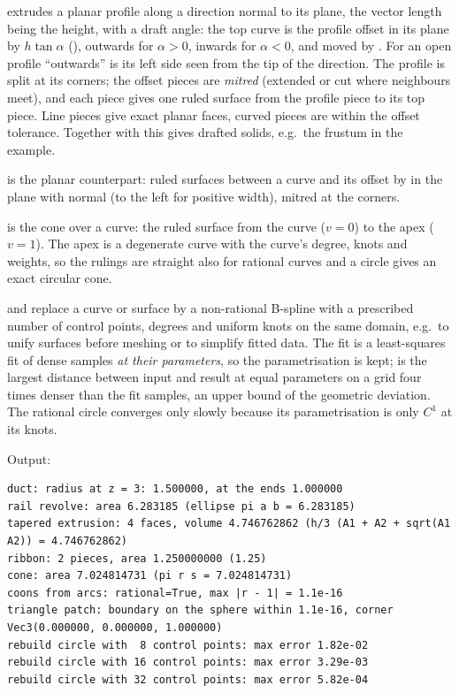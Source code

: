  extrudes a planar profile along a direction normal to its plane, the
vector length being the height, with a draft angle: the top curve is the profile offset in its
plane by $h\tan\alpha$ (), outwards for $\alpha > 0$, inwards for
$\alpha < 0$, and moved by . For an open profile ``outwards'' is its left side
seen from the tip of the direction. The profile is split at its corners; the offset pieces are
\emph{mitred} (extended or cut where neighbours meet), and each piece gives one ruled surface
from the profile piece to its top piece. Line pieces give exact planar faces, curved pieces are
within the offset tolerance. Together with  this gives drafted solids, e.g.\ the
frustum in the example.

 is the planar counterpart: ruled surfaces between a curve and its offset by
 in the plane with normal  (to the left for positive width),
mitred at the corners.

 is the cone over a curve: the ruled surface from the curve ($v = 0$)
to the apex ($v = 1$). The apex is a degenerate curve with the curve's degree, knots and
weights, so the rulings are straight also for rational curves and a circle gives an exact
circular cone.

 and  replace a curve or surface by a
non-rational B-spline with a prescribed number of control points, degrees and uniform knots on
the same domain, e.g.\ to unify surfaces before meshing or to simplify fitted data. The fit is
a least-squares fit of dense samples \emph{at their parameters}, so the parametrisation is kept;
 is the largest distance between input and result at equal parameters on a
grid four times denser than the fit samples, an upper bound of the geometric deviation. The
rational circle converges only slowly because its parametrisation is only $C^1$ at its knots.


Output:

\begin{lstlisting}[style=text]
duct: radius at z = 3: 1.500000, at the ends 1.000000
rail revolve: area 6.283185 (ellipse pi a b = 6.283185)
tapered extrusion: 4 faces, volume 4.746762862 (h/3 (A1 + A2 + sqrt(A1 A2)) = 4.746762862)
ribbon: 2 pieces, area 1.250000000 (1.25)
cone: area 7.024814731 (pi r s = 7.024814731)
coons from arcs: rational=True, max |r - 1| = 1.1e-16
triangle patch: boundary on the sphere within 1.1e-16, corner Vec3(0.000000, 0.000000, 1.000000)
rebuild circle with  8 control points: max error 1.82e-02
rebuild circle with 16 control points: max error 3.29e-03
rebuild circle with 32 control points: max error 5.82e-04
\end{lstlisting}
